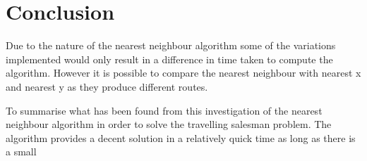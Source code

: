 \documentclass[conference,backref=page]{acmsiggraph}
\begin{document}
\section{Conclusion}

Due to the nature of the nearest neighbour algorithm some of the variations implemented would only result in a difference in time taken to compute the algorithm. However it is possible to compare the nearest neighbour with nearest x and nearest y as they produce different routes. 



To summarise what has been found from this investigation of the nearest neighbour algorithm in order to solve the travelling salesman problem. The algorithm provides a decent solution in a relatively quick time as long as there is a small 




\end{document}
